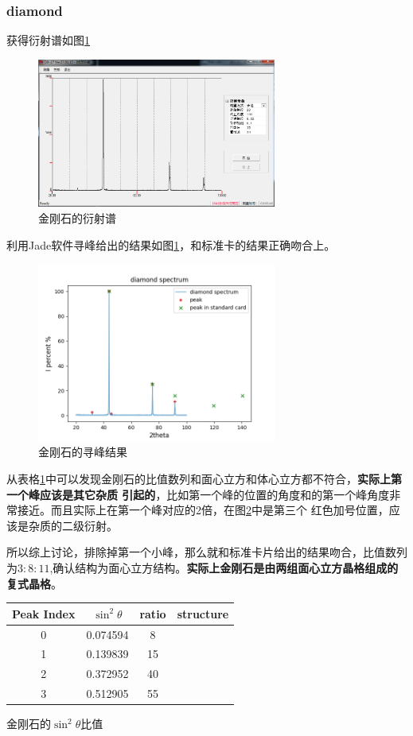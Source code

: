 \documentclass[10pt]{ctexart}
\begin{document}
\subsubsection{diamond}
获得衍射谱如图\ref{fig:diamond}
\begin{figure}
    \centering
    \includegraphics[width=0.7\textwidth]{data/diamond/diamond.png}
    \caption{金刚石的衍射谱}
    \label{fig:diamond}
\end{figure}
利用Jade软件寻峰给出的结果如图\ref{fig:diamond}，和标准卡的结果正确吻合上。
\begin{figure}
    \centering
    \includegraphics[width=0.7\textwidth]{data/diamond/spectrum.png}
    \caption{金刚石的寻峰结果}
    \label{fig:diamondJadespec}
\end{figure}
从表格\ref{tab:diamondPeakRatio}中可以发现金刚石的比值数列和面心立方和体心立方都不符合，\textbf{实际上第一个峰应该是其它杂质
引起的}，比如第一个峰的位置的角度和的第一个峰角度非常接近。而且实际上在第一个峰对应的2倍，在图\ref{fig:diamondJadespec}中是第三个
红色加号位置，应该是杂质的二级衍射。

所以综上讨论，排除掉第一个小峰，那么就和标准卡片给出的结果吻合，比值数列为$3:8:11$,确认结构为面心立方结构。\textbf{实际上金刚石是由两组面心立方晶格组成的复式晶格\cite{gutiPhys}}。
\begin{table}
    \begin{tabular}{|c|c|c|c|}
        \textbf{Peak Index} & \textbf{$\sin^2{\theta}$}& \textbf{ratio}& \textbf{structure}\\
        \hline
        0  &  0.074594&8&\\
    1   & 0.139839&15&\\
    2  &  0.372952&40&\\
    3  &  0.512905&55&\\
    \end{tabular}
    \centering
    金刚石的$\sin^2{\theta}$比值
    \label{tab:diamondPeakRatio}
\end{table}
\end{document}
